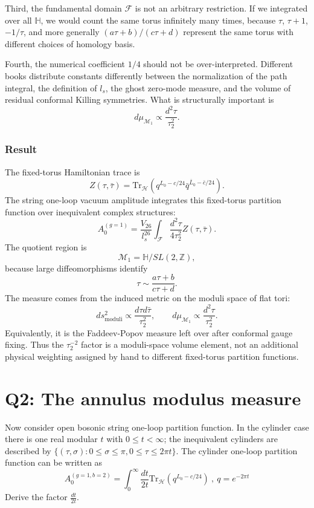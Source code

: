 \documentclass[
  10pt,
  a4paper,
  openany]{book}
\begin{document}
Third, the fundamental domain \(\mathcal F\) is not an arbitrary
restriction. If we integrated over all \(\mathbb H\), we would count the
same torus infinitely many times, because \(\tau\), \(\tau+1\),
\(-1/\tau\), and more generally \((a\tau+b)/(c\tau+d)\) represent the
same torus with different choices of homology basis.

Fourth, the numerical coefficient \(1/4\) should not be
over-interpreted. Different books distribute constants differently
between the normalization of the path integral, the definition of
\(l_s\), the ghost zero-mode measure, and the volume of residual
conformal Killing symmetries. What is structurally important is \[
d\mu_{\mathcal M_1}\propto \frac{d^2\tau}{\tau_2^2}.
\]

\subsubsection{Result}\label{result}

The fixed-torus Hamiltonian trace is \[
Z(\tau,\bar\tau)
=
\mathrm{Tr}_{\mathcal H}
\left(
q^{L_0-c/24}
\bar q^{\bar L_0-\bar c/24}
\right).
\] The string one-loop vacuum amplitude integrates this fixed-torus
partition function over inequivalent complex structures: \[
A_0^{(g=1)}
=
\frac{V_{26}}{l_s^{26}}
\int_{\mathcal F}
\frac{d^2\tau}{4\tau_2^2}
Z(\tau,\bar\tau).
\] The quotient region is \[
\mathcal M_1
=
\mathbb H/SL(2,\mathbb Z),
\] because large diffeomorphisms identify \[
\tau\sim \frac{a\tau+b}{c\tau+d}.
\] The measure comes from the induced metric on the moduli space of flat
tori: \[
ds^2_{\mathrm{moduli}}
\propto
\frac{d\tau d\bar\tau}{\tau_2^2},
\qquad
d\mu_{\mathcal M_1}
\propto
\frac{d^2\tau}{\tau_2^2}.
\] Equivalently, it is the Faddeev-Popov measure left over after
conformal gauge fixing. Thus the \(\tau_2^{-2}\) factor is a
moduli-space volume element, not an additional physical weighting
assigned by hand to different fixed-torus partition functions.

\section{Q2: The annulus modulus
measure}\label{q2-the-annulus-modulus-measure}

Now consider open bosonic string one-loop partition function. In the
cylinder case there is one real modular \(t\) with \(0\leq t<\infty\);
the inequivalent cylinders are described by
\(\{ (\tau,\sigma):0\leq\sigma\leq \pi , 0\leq \tau\leq 2\pi t \}\). The
cylinder one-loop partition function can be written as \[
A_{0}^{(g=1,b=2)}=\int_{0}^\infty \frac{dt}{2t} \mathrm{Tr}_{\mathcal{H}}(q^{L_{0}-c/24}) \ , \ q=e^{-2\pi t}
\] Derive the factor \(\frac{dt}{2t}\).
\end{document}
